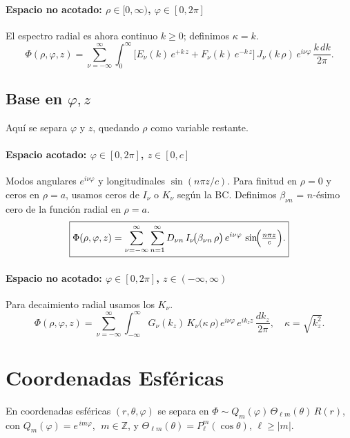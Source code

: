 \documentclass[12pt,a4paper]{article}
\begin{document}
\paragraph{Espacio no acotado: \(\rho\in[0,\infty)\), \(\varphi\in[0,2\pi]\)}  
El espectro radial es ahora continuo \(k\ge0\); definimos \(\kappa=k\).  
\[
\boxed{
\Phi(\rho,\varphi,z)
=\sum_{\nu=-\infty}^{\infty}
\int_{0}^{\infty}
\bigl[
E_{\nu}(k)\,e^{+k\,z}
+F_{\nu}(k)\,e^{-k\,z}
\bigr]\,
J_{\nu}(k\,\rho)\,
e^{i\nu\varphi}\,
\frac{k\,dk}{2\pi}.
}
\]
\subsection{Base en \(\varphi,z\)}

Aquí se separa \(\varphi\) y \(z\), quedando \(\rho\) como variable restante.

\paragraph{Espacio acotado: \(\varphi\in[0,2\pi]\), \(z\in[0,c]\)}  
Modos angulares \(e^{i\nu\varphi}\) y longitudinales \(\sin(n\pi z/c)\).  
Para finitud en \(\rho=0\) y ceros en \(\rho=a\), usamos ceros de \(I_\nu\) o \(K_\nu\) según la BC.  
Definimos \(\beta_{\nu n}\) = \(n\)-ésimo cero de la función radial en \(\rho=a\).  
\[
\boxed{
\Phi(\rho,\varphi,z)
=\sum_{\nu=-\infty}^{\infty}\sum_{n=1}^{\infty}
D_{\nu n}\,
I_{\nu}\!\bigl(\beta_{\nu n}\,\rho\bigr)\,
e^{i\nu\varphi}\,
\sin\!\Bigl(\tfrac{n\pi z}{c}\Bigr).
}
\]

\paragraph{Espacio no acotado: \(\varphi\in[0,2\pi]\), \(z\in(-\infty,\infty)\)}  
Para decaimiento radial usamos los \(K_\nu\).  
\[
\boxed{
\Phi(\rho,\varphi,z)
=\sum_{\nu=-\infty}^{\infty}
\int_{-\infty}^{\infty}
G_{\nu}(k_z)\,
K_{\nu}\bigl(\kappa\,\rho\bigr)\,
e^{i\nu\varphi}\,
e^{i k_z z}\,
\frac{dk_z}{2\pi},
\quad
\kappa=\sqrt{k_z^2}.
}
\]

\section{Coordenadas Esféricas}

En coordenadas esféricas \((r,\theta,\varphi)\) se separa en
\(\Phi\sim Q_m(\varphi)\,\Theta_{\ell m}(\theta)\,R(r)\),
con \(Q_m(\varphi)=e^{\,i m\varphi}\), \(\;m\in\mathbb Z\), y
\(\Theta_{\ell m}(\theta)=P_\ell^m(\cos\theta)\), \(\ell\ge |m|\).
\end{document}

